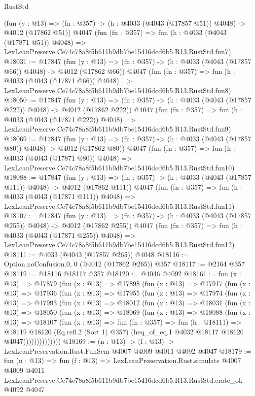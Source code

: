 \begin{lexlean}{RustStd}
\begin{coremodule}
    (fun (y : @13) => (fn : @357) -> (h : @4033 (@4043 (@17857 @51)) @4048) -> @4012 (@17862 @51))
    @4047
    (fun (fn : @357) =>
    fun (h : @4033 (@4043 (@17871 @51)) @4048) =>
    LexLeanPreserve.Ce74c78a8f5b611b9db7be15416dcd6b5.R13.RustStd.fun7)
@18031 := @17847
    (fun (y : @13) => (fn : @357) -> (h : @4033 (@4043 (@17857 @66)) @4048) -> @4012 (@17862 @66))
    @4047
    (fun (fn : @357) =>
    fun (h : @4033 (@4043 (@17871 @66)) @4048) =>
    LexLeanPreserve.Ce74c78a8f5b611b9db7be15416dcd6b5.R13.RustStd.fun8)
@18050 := @17847
    (fun (y : @13) => (fn : @357) -> (h : @4033 (@4043 (@17857 @222)) @4048) -> @4012 (@17862 @222))
    @4047
    (fun (fn : @357) =>
    fun (h : @4033 (@4043 (@17871 @222)) @4048) =>
    LexLeanPreserve.Ce74c78a8f5b611b9db7be15416dcd6b5.R13.RustStd.fun9)
@18069 := @17847
    (fun (y : @13) => (fn : @357) -> (h : @4033 (@4043 (@17857 @80)) @4048) -> @4012 (@17862 @80))
    @4047
    (fun (fn : @357) =>
    fun (h : @4033 (@4043 (@17871 @80)) @4048) =>
    LexLeanPreserve.Ce74c78a8f5b611b9db7be15416dcd6b5.R13.RustStd.fun10)
@18088 := @17847
    (fun (y : @13) => (fn : @357) -> (h : @4033 (@4043 (@17857 @111)) @4048) -> @4012 (@17862 @111))
    @4047
    (fun (fn : @357) =>
    fun (h : @4033 (@4043 (@17871 @111)) @4048) =>
    LexLeanPreserve.Ce74c78a8f5b611b9db7be15416dcd6b5.R13.RustStd.fun11)
@18107 := @17847
    (fun (y : @13) => (fn : @357) -> (h : @4033 (@4043 (@17857 @255)) @4048) -> @4012 (@17862 @255))
    @4047
    (fun (fn : @357) =>
    fun (h : @4033 (@4043 (@17871 @255)) @4048) =>
    LexLeanPreserve.Ce74c78a8f5b611b9db7be15416dcd6b5.R13.RustStd.fun12)
@18111 := @4033 (@4043 (@17857 @265)) @4048
@18116 := Option.noConfusion.{0, 0} (@4012 (@17862 @265)) @357
@18117 := @2164 @357
@18119 := @18116 @18117 @357
@18120 := @4046 @4092
@18161 := fun (x : @13) =>
  @17879
    (fun (x : @13) =>
    @17898
      (fun (x : @13) =>
      @17917
        (fun (x : @13) =>
        @17936
          (fun (x : @13) =>
          @17955
            (fun (x : @13) =>
            @17974
              (fun (x : @13) =>
              @17993
                (fun (x : @13) =>
                @18012
                  (fun (x : @13) =>
                  @18031
                    (fun (x : @13) =>
                    @18050
                      (fun (x : @13) =>
                      @18069
                        (fun (x : @13) =>
                        @18088
                          (fun (x : @13) =>
                          @18107
                            (fun (x : @13) =>
                            fun (fn : @357) =>
                            fun (h : @18111) =>
                            @18119
                              @18120
                              (Eq.refl.{2} (Sort 1) @357)
                              (heq_of_eq.{1} @4032 @18117 @18120 @4047))))))))))))))
@18169 := (n : @13) -> (f : @13) -> LexLeanPreservation.Rust.FunSem @4007 @4009 @4011 @4092 @4047
@18179 := fun (n : @13) =>
  fun (f : @13) =>
  LexLeanPreservation.Rust.simulate
    @4007
    @4009
    @4011
    LexLeanPreserve.Ce74c78a8f5b611b9db7be15416dcd6b5.R13.RustStd.crate_ok
    @4092
    @4047
\end{coremodule}
\end{lexlean}
